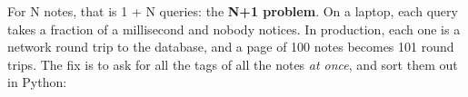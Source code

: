 \begin{codebox}[short]

\begin{Shaded}
\begin{Highlighting}[]
\NormalTok{)}
\OperatorTok{=}\NormalTok{ [row\_to\_note(row) }\NormalTok{ cursor.fetchall()]}
            \NormalTok{),}
\NormalTok{        (note[}\NormalTok{],),}
\NormalTok{    )}
\NormalTok{    note[}\NormalTok{] }\OperatorTok{=}\NormalTok{ [row[}\NormalTok{] }\NormalTok{ cursor.fetchall()]}
\end{Highlighting}
\end{Shaded}

\end{codebox}

\noindent{}For N notes, that is 1 + N queries: the \textbf{N+1 problem}. On a laptop, each query takes a fraction of a millisecond and nobody notices. In production, each one is a network round trip to the database, and a page of 100 notes becomes 101 round trips. The fix is to ask for all the tags of all the notes \emph{at once}, and sort them out in Python:

